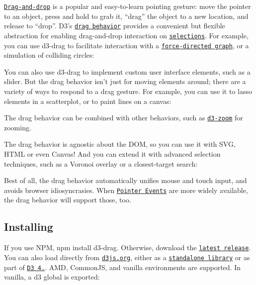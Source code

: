 \href{https://en.wikipedia.org/wiki/Drag_and_drop}{\tt Drag-\/and-\/drop} is a popular and easy-\/to-\/learn pointing gesture\+: move the pointer to an object, press and hold to grab it, “drag” the object to a new location, and release to “drop”. D3’s \href{#api-reference}{\tt drag behavior} provides a convenient but flexible abstraction for enabling drag-\/and-\/drop interaction on \href{https://github.com/d3/d3-selection}{\tt selections}. For example, you can use d3-\/drag to facilitate interaction with a \href{https://github.com/d3/d3-force}{\tt force-\/directed graph}, or a simulation of colliding circles\+:

\href{http://bl.ocks.org/mbostock/ad70335eeef6d167bc36fd3c04378048}{\tt }\href{http://bl.ocks.org/mbostock/2990a882e007f8384b04827617752738}{\tt }

You can also use d3-\/drag to implement custom user interface elements, such as a slider. But the drag behavior isn’t just for moving elements around; there are a variety of ways to respond to a drag gesture. For example, you can use it to lasso elements in a scatterplot, or to paint lines on a canvas\+:

\href{http://bl.ocks.org/mbostock/f705fc55e6f26df29354}{\tt }

The drag behavior can be combined with other behaviors, such as \href{https://github.com/d3/d3-zoom}{\tt d3-\/zoom} for zooming.

\href{http://bl.ocks.org/mbostock/3127661b6f13f9316be745e77fdfb084}{\tt }

The drag behavior is agnostic about the D\+OM, so you can use it with S\+VG, H\+T\+ML or even Canvas! And you can extend it with advanced selection techniques, such as a Voronoi overlay or a closest-\/target search\+:

\href{http://bl.ocks.org/mbostock/ec10387f24c1fad2acac3bc11eb218a5}{\tt }\href{http://bl.ocks.org/mbostock/c206c20294258c18832ff80d8fd395c3}{\tt }

Best of all, the drag behavior automatically unifies mouse and touch input, and avoids browser idiosyncrasies. When \href{https://www.w3.org/TR/pointerevents/}{\tt Pointer Events} are more widely available, the drag behavior will support those, too.

\subsection*{Installing}

If you use N\+PM, {\ttfamily npm install d3-\/drag}. Otherwise, download the \href{https://github.com/d3/d3-drag/releases/latest}{\tt latest release}. You can also load directly from \href{https://d3js.org}{\tt d3js.\+org}, either as a \href{https://d3js.org/d3-drag.v1.min.js}{\tt standalone library} or as part of \href{https://github.com/d3/d3}{\tt D3 4.}. A\+MD, Common\+JS, and vanilla environments are supported. In vanilla, a {\ttfamily d3} global is exported\+:


